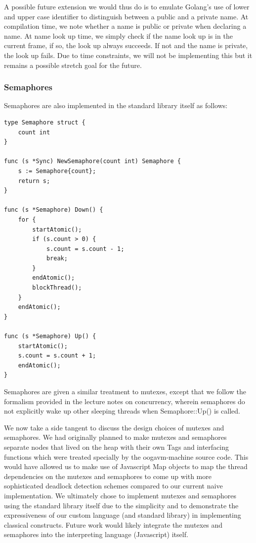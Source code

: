 \documentclass{report}
\begin{document}
A possible future extension we would thus do is to emulate Golang's use of lower and upper case identifier to distinguish between a public and a private name. At compilation time, we note whether a name is public or private when declaring a name. At name look up time, we simply check if the name look up is in the current frame, if so, the look up always succeeds. If not and the name is private, the look up fails. Due to time constraints, we will not be implementing this but it remains a possible stretch goal for the future.

\subsubsection{Semaphores}

Semaphores are also implemented in the standard library itself as follows:

\begin{verbatim}
type Semaphore struct {
    count int
}

func (s *Sync) NewSemaphore(count int) Semaphore {
    s := Semaphore{count};
    return s;
}

func (s *Semaphore) Down() {
    for {
        startAtomic();
        if (s.count > 0) {
            s.count = s.count - 1;
            break;
        }
        endAtomic();
        blockThread();
    }
    endAtomic();
}

func (s *Semaphore) Up() {
    startAtomic();
    s.count = s.count + 1;
    endAtomic();
}    
\end{verbatim}

Semaphores are given a similar treatment to mutexes, except that we follow the formalism provided in the lecture notes on concurrency, wherein semaphores do not explicitly wake up other sleeping threads when Semaphore::Up() is called.

We now take a side tangent to discuss the design choices of mutexes and semaphores. We had originally planned to make mutexes and semaphores separate nodes that lived on the heap with their own Tags and interfacing functions which were treated specially by the oogavm-machine source code. This would have allowed us to make use of Javascript Map objects to map the thread dependencies on the mutexes and semaphores to come up with more sophisticated deadlock detection schemes compared to our current naive implementation. We ultimately chose to implement mutexes and semaphores using the standard library itself due to the simplicity and to demonstrate the expressiveness of our custom language (and standard library) in implementing classical constructs. Future work would likely integrate the mutexes and semaphores into the interpreting language (Javascript) itself.
\end{document}
